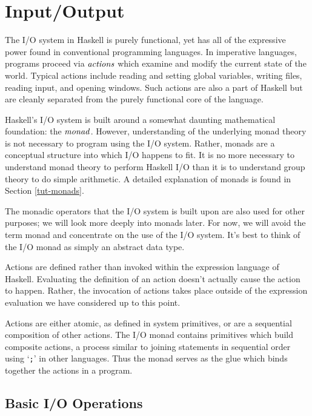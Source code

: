 

\section{Input/Output}
\label{tut-io}

The I/O system in Haskell is purely functional, yet has all of the
expressive power found in conventional programming languages.  In
imperative languages, programs proceed via \mbox{$\it actions$} which examine and
modify the current state of the world.  Typical actions include
reading and setting global variables, writing files, reading input,
and opening windows.  Such actions are also a part of Haskell but are
cleanly separated from the purely functional core of the language.

Haskell's I/O system is built around a somewhat daunting mathematical
foundation: the \mbox{$\it monad$}.  However, understanding of the underlying
monad theory is not necessary to program using the I/O system.
Rather, monads are a conceptual structure into which I/O happens to fit.
It is no more necessary to understand monad theory to perform Haskell
I/O than it is to understand group theory to do simple arithmetic.  A
detailed explanation of monads is found in Section \ref{tut-monads}.

The monadic operators that the I/O system 
is built upon are also used for other purposes; we will look
more deeply into monads later.  For now, we will avoid the term monad
and concentrate on the use of the I/O system.  It's best to think of
the I/O monad as simply an abstract data type.   

Actions are defined rather than invoked within the expression
language of Haskell.
Evaluating the definition of an action doesn't actually
cause the action to happen.  Rather, the invocation of actions takes
place outside of the expression evaluation we have considered up to
this point.

Actions are either atomic, as defined in system primitives, or
are a sequential composition of other actions.  
The I/O monad contains primitives which
build composite actions, a process similar to joining
statements in sequential order using `\mbox{\tt ;}' in other languages.  Thus
the monad serves as the glue which binds together the actions in a
program. 

\subsection{Basic I/O Operations}

